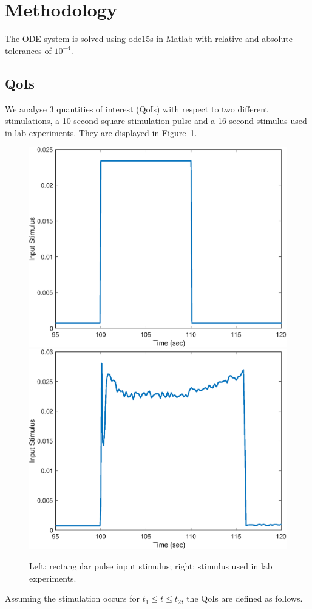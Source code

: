 \section{Methodology}
The ODE system is solved using ode15s in Matlab with relative and absolute tolerances of $10^{-4}$.
\subsection{QoIs}
We analyse 3 quantities of interest (QoIs) with respect to two different stimulations, a 10 second square stimulation pulse and a 16 second stimulus used in lab experiments. They are displayed in Figure~\ref{input_stimuli}.
\begin{figure}[h]
\centering
\includegraphics[width=.4 \textwidth]{Figures/Rectangular_Stimulus.eps}
\includegraphics[width=.4 \textwidth]{Figures/Experimental_Stimulus.eps}
\caption{Left: rectangular pulse input stimulus; right: stimulus used in lab experiments.}
\label{input_stimuli}
\end{figure}
 Assuming the stimulation occurs for $t_1\le t \le t_2$, the QoIs are defined as follows.
